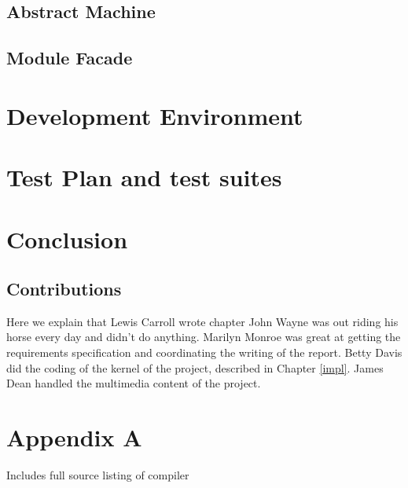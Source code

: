 \documentclass{l3proj}
\begin{document}
\section{Abstract Machine}
\label{arch-abs}

\section{Module Facade}
\label{arch-module}

\chapter{Development Environment}
\label{dev}

\chapter{Test Plan and test suites}
\label{test}

\chapter{Conclusion}
\label{conc}

\section{Contributions}
\label{cont}
Here we explain that Lewis Carroll wrote chapter  John Wayne
was out riding his horse every day and didn't do anything. Marilyn Monroe
was great at getting the requirements specification and coordinating the
writing of the report. Betty Davis did the coding of the kernel of the
project, described in Chapter \ref{impl}.  James Dean handled the
multimedia content of the project.
\chapter{Appendix A}
\label{appa}

Includes full source listing of compiler




\end{document}
